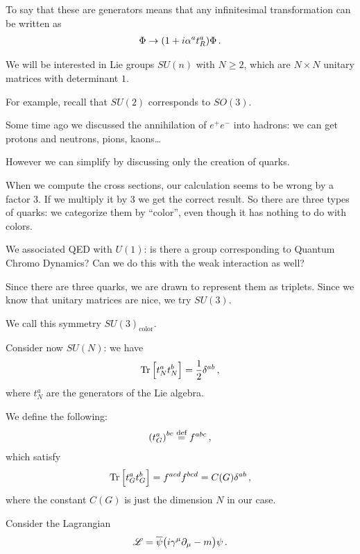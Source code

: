 \documentclass[main.tex]{subfiles}
\begin{document}
To say that these are generators means that any infinitesimal transformation can be written as 
%
\begin{align}
\Phi \to \qty(1 + i \alpha^{a} t^{a}_{R}) \Phi 
\,.
\end{align}

We will be interested in Lie groups \(SU(n)\) with \(N\geq 2\), which are \(N \times N\) unitary matrices with determinant \(1\).

For example, recall that \(SU(2)\) corresponds to \(SO(3)\). 

Some time ago we discussed the annihilation  of \(e^{+} e^{-}\) into hadrons: we can get protons and neutrons, pions, kaons\dots

However we can simplify by discussing only the creation of quarks. 

When we compute the cross sections, our calculation seems to be wrong by a factor 3. If we multiply it by 3 we get the correct result. 
So there are three types of quarks: we categorize them by ``color'', even though it has nothing to do with colors. 

We associated QED  with \(U(1)\): is there a group corresponding to Quantum Chromo Dynamics?
Can we do this with the weak interaction as well? 

Since there are three quarks, we are drawn to represent them as triplets. 
Since we know that unitary matrices are nice, we try \(SU(3)\). 

We call this symmetry \(SU(3)_{\text{color}}\). 

Consider now \(SU(N)\): we have 
%
\begin{align}
\Tr \qty[t^{a}_{N} t^{b}_{N}] = \frac{1}{2} \delta^{ab}
\,,
\end{align}
%
where \(t^{a}_{N}\) are the generators of the Lie algebra. 

We define the following: 
%
\begin{align}
\qty(t^{a}_{G})^{bc} \overset{\text{def}}{=} f^{abc}
\,,
\end{align}
%
which satisfy 
%
\begin{align}
\Tr \qty[t^{a}_{G} t^{b}_{G}] = f^{acd} f^{bcd} = C(G) \delta^{ab}
\,,
\end{align}
%
where the constant \(C(G)\) is just the dimension \(N\) in our case. 

Consider the Lagrangian 
%
\begin{align}
\mathscr{L} = \overline{\psi} \qty(i \gamma^{\mu } \partial_{\mu } - m ) \psi 
\,.
\end{align}
\end{document}
